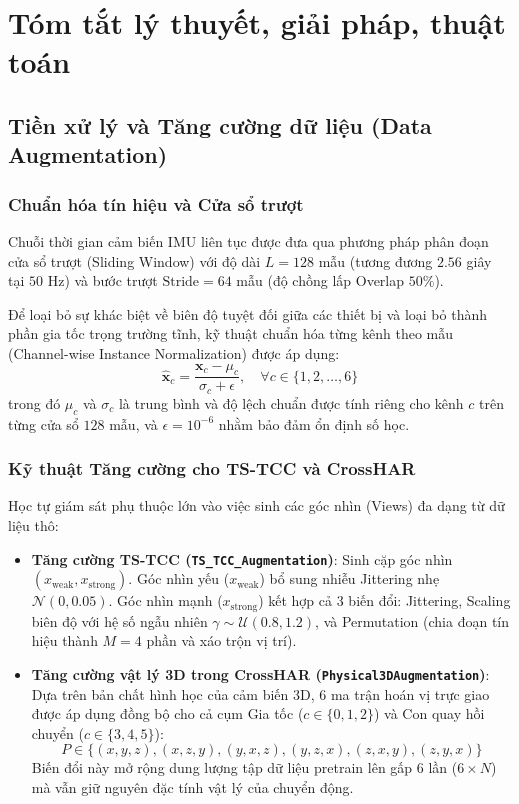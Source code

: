 \section{Tóm tắt lý thuyết, giải pháp, thuật toán}

\subsection{Tiền xử lý và Tăng cường dữ liệu (Data Augmentation)}
\subsubsection{Chuẩn hóa tín hiệu và Cửa sổ trượt}
Chuỗi thời gian cảm biến IMU liên tục được đưa qua phương pháp phân đoạn cửa sổ trượt (Sliding Window) với độ dài $L = 128$ mẫu (tương đương $2.56$ giây tại $50\text{ Hz}$) và bước trượt $\text{Stride} = 64$ mẫu (độ chồng lấp Overlap $50\%$). 

Để loại bỏ sự khác biệt về biên độ tuyệt đối giữa các thiết bị và loại bỏ thành phần gia tốc trọng trường tĩnh, kỹ thuật chuẩn hóa từng kênh theo mẫu (Channel-wise Instance Normalization) được áp dụng:
\begin{equation}
    \hat{\mathbf{x}}_{c} = \frac{\mathbf{x}_{c} - \mu_{c}}{\sigma_{c} + \epsilon}, \quad \forall c \in \{1, 2, \dots, 6\}
\end{equation}
trong đó $\mu_{c}$ và $\sigma_{c}$ là trung bình và độ lệch chuẩn được tính riêng cho kênh $c$ trên từng cửa sổ $128$ mẫu, và $\epsilon = 10^{-6}$ nhằm bảo đảm ổn định số học.

\subsubsection{Kỹ thuật Tăng cường cho TS-TCC và CrossHAR}
Học tự giám sát phụ thuộc lớn vào việc sinh các góc nhìn (Views) đa dạng từ dữ liệu thô:
\begin{itemize}
    \item \textbf{Tăng cường TS-TCC (\texttt{TS\_TCC\_Augmentation})}: Sinh cặp góc nhìn $(x_{\text{weak}}, x_{\text{strong}})$. Góc nhìn yếu ($x_{\text{weak}}$) bổ sung nhiễu Jittering nhẹ $\mathcal{N}(0, 0.05)$. Góc nhìn mạnh ($x_{\text{strong}}$) kết hợp cả 3 biến đổi: Jittering, Scaling biên độ với hệ số ngẫu nhiên $\gamma \sim \mathcal{U}(0.8, 1.2)$, và Permutation (chia đoạn tín hiệu thành $M=4$ phần và xáo trộn vị trí).
    \item \textbf{Tăng cường vật lý 3D trong CrossHAR (\texttt{Physical3DAugmentation})}: Dựa trên bản chất hình học của cảm biến 3D, 6 ma trận hoán vị trực giao được áp dụng đồng bộ cho cả cụm Gia tốc ($c \in \{0, 1, 2\}$) và Con quay hồi chuyển ($c \in \{3, 4, 5\}$):
    \begin{equation}
        P \in \{ (x,y,z), (x,z,y), (y,x,z), (y,z,x), (z,x,y), (z,y,x) \}
    \end{equation}
    Biến đổi này mở rộng dung lượng tập dữ liệu pretrain lên gấp 6 lần ($6 \times N$) mà vẫn giữ nguyên đặc tính vật lý của chuyển động.
\end{itemize}

